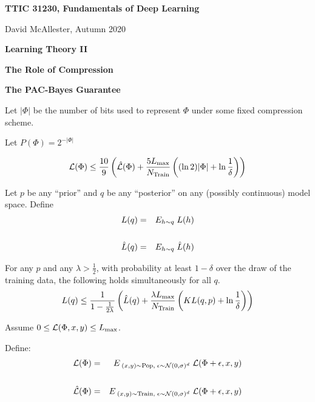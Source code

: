 




{\Huge


\centerline{\bf TTIC 31230, Fundamentals of Deep Learning}
\bigskip
\centerline{David McAllester, Autumn 2020}

\vfill
\centerline{\bf Learning Theory II}
\vfill
\centerline{\bf The Role of Compression}
\vfill
\centerline{\bf The PAC-Bayes Guarantee}

\vfill
\vfill



Let $|\Phi|$ be the number of bits used to represent $\Phi$ under some fixed compression scheme.

\vfill
Let $P(\Phi) = 2^{-|\Phi|}$

\vfill
    $${\cal L}(\Phi) \leq \frac{10}{9}\left(\hat{\cal L}(\Phi) + \frac{5 L_\mathrm{max}}{N_\mathrm{Train}}\left((\ln 2)|\Phi| + \ln\frac{1}{\delta}\right)\right)$$



Let $p$ be any ``prior'' and $q$ be any ``posterior'' on any  (possibly continuous) model space.
Define
\begin{eqnarray*}
  L(q) & =  &E_{h \sim q}\;L(h) \\
  \\
  \hat{L}(q) & =  &E_{h \sim q}\;\hat{L}(h)
\end{eqnarray*}


\vfill
For any $p$ and any $\lambda > \frac{1}{2}$, with probability
at least $1-\delta$ over the draw of the training data, the following holds simultaneously for all $q$.
\vfill
$$L(q) \leq \frac{1}{1-\frac{1}{2\lambda}}\left(\hat{L}(q) + \frac{\lambda L_{\max}}{N_\mathrm{Train}}\left(KL(q,p) + \ln \frac{1}{\delta}\right)\right)$$


Assume $0 \leq {\cal L}(\Phi,x,y) \leq L_{\max}$.

\vfill
Define:
\begin{eqnarray*}
{\cal L}(\Phi) & = & E_{\;(x,y)\sim \mathrm{Pop},\;\epsilon \sim {\cal N}(0,\sigma)^d}\;{{\cal L}(\Phi+\epsilon,x,y)} \\
\\
\hat{{\cal L}}(\Phi) & = & E_{\;(x,y)\sim \mathrm{Train},\;\epsilon \sim {\cal N}(0,\sigma)^d}\;{{\cal L}(\Phi+\epsilon,x,y)} \\
\end{eqnarray*}

}
